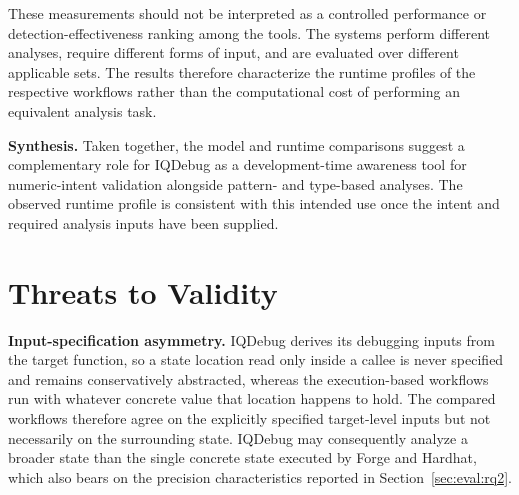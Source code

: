 \documentclass[11pt,oneside]{report}
\theoremstyle{plain}
\theoremstyle{definition}
\theoremstyle{remark}
\begin{document}
These measurements should not be interpreted as a controlled performance or
detection-effectiveness ranking among the tools. The systems perform different
analyses, require different forms of input, and are evaluated over different
applicable sets. The results therefore characterize the runtime profiles of the
respective workflows rather than the computational cost of performing an
equivalent analysis task.

\smallskip
\noindent\textbf{Synthesis.}
Taken together, the model and runtime comparisons suggest a complementary role
for IQDebug as a development-time awareness tool for numeric-intent
validation alongside pattern- and type-based analyses. The
observed runtime profile is consistent with this intended use once the intent
and required analysis inputs have been supplied.

\section{Threats to Validity}\label{sec:eval:threats}

\noindent\textbf{Input-specification asymmetry.}
IQDebug derives its debugging inputs from the target function, so a state
location read only inside a callee is never specified and remains
conservatively abstracted, whereas the execution-based workflows run with
whatever concrete value that location happens to hold. The compared workflows
therefore agree on the explicitly specified target-level inputs but not
necessarily on the surrounding state. IQDebug may consequently analyze a
broader state than the single concrete state executed by Forge and Hardhat,
which also bears on the precision characteristics reported in
Section~\ref{sec:eval:rq2}.
\end{document}
